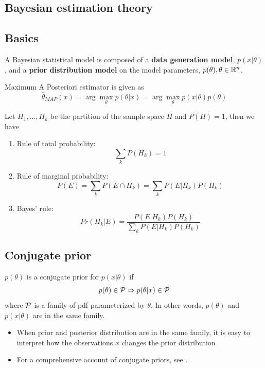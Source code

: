 \begin{refsection}
\section{Bayesian estimation theory}
\subsection{Basics}
\begin{definition}
	A Bayesian statistical model is composed of a \textbf{data generation model}, $p(x|\theta)$, and a \textbf{prior distribution model} on the model parameters, $p(\theta),\theta\in \mathbb{R}^n$. 
\end{definition}


\begin{definition}
	Maximum A Posteriori estimator is given as
	$$\hat{\theta}_{MAP}(x) = \arg\max_{\theta} p(\theta|x) = \arg\max_{\theta} p(x|\theta)p(\theta)$$
\end{definition}


\begin{lemma}\cite[15]{hoff2009first}\hfill
	Let $H_1,...,H_k$ be the partition of the sample space $H$ and $P(H) = 1$, then we have
	\begin{enumerate}
		\item Rule of total probability:
		$$\sum_k P(H_k) = 1$$
		\item Rule of marginal probability:
		$$P(E) = \sum_k P(E\cap H_k) = \sum_k P(E|H_k)P(H_k)$$
		\item Bayes' rule:
		$$Pr(H_k|E) = \frac{P(E|H_k)P(H_k)}{\sum_k P(E|H_k)P(H_k)}$$    
	\end{enumerate}
	
\end{lemma}

\subsection{Conjugate prior}
\begin{definition} 
	$p(\theta)$ is a conjugate prior for $p(x|\theta)$ if
	$$p(\theta) \in \mathcal{P} \Rightarrow p(\theta|x) \in \mathcal{P}$$
	where $\mathcal{P}$ is a family of pdf parameterized by $\theta$. In other words, $p(\theta)$ and $p(x|\theta)$ are in the same family.
\end{definition}

\begin{remark}\hfill
	\begin{itemize}
		\item When prior and posterior distribution are in the same family, it is easy to interpret how the observations $x$ changes the prior distribution
		\item For a comprehensive account of conjugate priors, see \cite{fink1997compendium}\cite{wiki:conjugateprior}.
	\end{itemize}
\end{remark}



\end{refsection}
